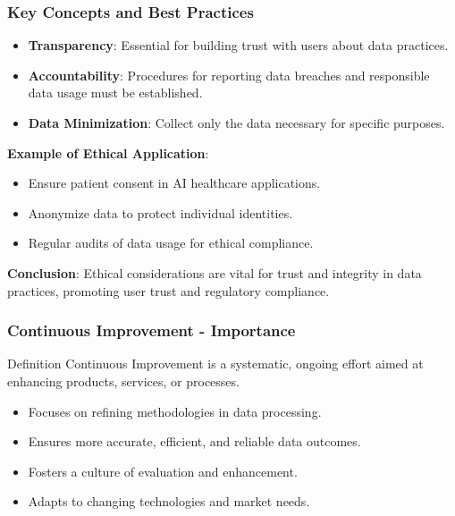 \documentclass[aspectratio=169]{beamer}
\begin{document}
\begin{frame}[fragile]
    \frametitle{Key Concepts and Best Practices}

    \begin{itemize}
        \item \textbf{Transparency}: Essential for building trust with users about data practices.
        \item \textbf{Accountability}: Procedures for reporting data breaches and responsible data usage must be established.
        \item \textbf{Data Minimization}: Collect only the data necessary for specific purposes.
    \end{itemize}
    
    \vspace{0.5cm}
    
    \textbf{Example of Ethical Application}:
    \begin{itemize}
        \item Ensure patient consent in AI healthcare applications.
        \item Anonymize data to protect individual identities.
        \item Regular audits of data usage for ethical compliance.
    \end{itemize}
    
    \textbf{Conclusion}:
    Ethical considerations are vital for trust and integrity in data practices, promoting user trust and regulatory compliance.
\end{frame}

\begin{frame}[fragile]
    \frametitle{Continuous Improvement - Importance}
    \begin{block}{Definition}
        Continuous Improvement is a systematic, ongoing effort aimed at enhancing products, services, or processes. 
    \end{block}
    \begin{itemize}
        \item Focuses on refining methodologies in data processing.
        \item Ensures more accurate, efficient, and reliable data outcomes.
        \item Fosters a culture of evaluation and enhancement.
        \item Adapts to changing technologies and market needs.
    \end{itemize}
\end{frame}
\end{document}
